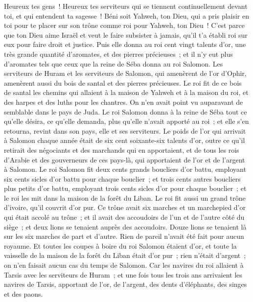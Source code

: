 \begin{multicols}{2}
Heureux tes gens~! Heureux tes serviteurs qui se tiennent continuellement devant toi, et qui entendent ta sagesse~!
Béni soit Yahweh, ton Dieu, qui a pris plaisir en toi pour te placer sur son trône comme roi pour Yahweh, ton Dieu~! C'est parce que ton Dieu aime Israël et veut le faire subsister à jamais, qu'il t'a établi roi sur eux pour faire droit et justice.
Puis elle donna au roi cent vingt talents d'or, une très grande quantité d'aromates, et des pierres précieuses~; et il n'y eut plus d'aromates tels que ceux que la reine de Séba donna au roi Salomon.
Les serviteurs de Huram et les serviteurs de Salomon, qui amenèrent de l'or d'Ophir, amenèrent aussi du bois de santal et des pierres précieuses.
Le roi fit de ce bois de santal les chemins qui allaient à la maison de Yahweh et à la maison du roi, et des harpes et des luths pour les chantres. On n'en avait point vu auparavant de semblable dans le pays de Juda.
Le roi Salomon donna à la reine de Séba tout ce qu'elle désira, ce qu'elle demanda, plus qu'elle n'avait apporté au roi~; et elle s'en retourna, revint dans son pays, elle et ses serviteurs.
Le poids de l'or qui arrivait à Salomon chaque année était de six cent soixante-six talents d'or,
outre ce qu'il retirait des négociants et des marchands qui en apportaient, et de tous les rois d'Arabie et des gouverneurs de ces pays-là, qui apportaient de l'or et de l'argent à Salomon.
Le roi Salomon fit deux cents grands boucliers d'or battu, employant six cents sicles d'or battu pour chaque bouclier~;
et trois cents autres boucliers plus petits d'or battu, employant trois cents sicles d'or pour chaque bouclier~; et le roi les mit dans la maison de la forêt du Liban.
Le roi fit aussi un grand trône d'ivoire, qu'il couvrit d'or pur.
Ce trône avait six marches et un marchepied d'or qui était accolé au trône~; et il avait des accoudoirs de l'un et de l'autre côté du siège~; et deux lions se tenaient auprès des accoudoirs.
Douze lions se tenaient là sur les six marches de part et d'autre. Rien de pareil n'avait été fait pour aucun royaume.
Et toutes les coupes à boire du roi Salomon étaient d'or, et toute la vaisselle de la maison de la forêt du Liban était d'or pur~; rien n'était d'argent~; on n'en faisait aucun cas du temps de Salomon.
Car les navires du roi allaient à Tarsis avec les serviteurs de Huram~; et une fois tous les trois ans arrivaient les navires de Tarsis, apportant de l'or, de l'argent, des dents d'éléphants, des singes et des paons.

\end{multicols}
